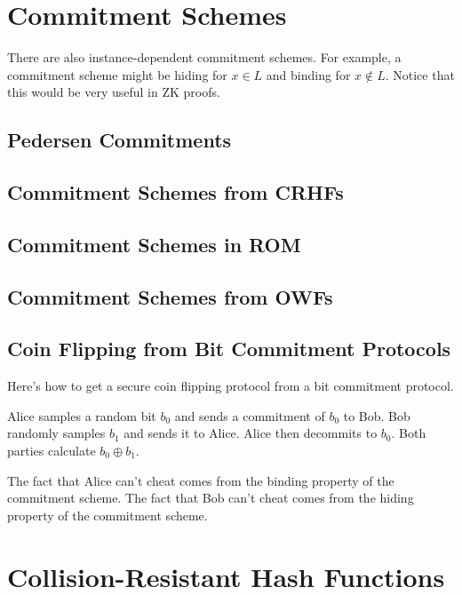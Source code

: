 \documentclass{article}
\theoremstyle{definition}
\begin{document}
\newpage

\section{Commitment Schemes}

There are also instance-dependent commitment schemes. For example, a commitment scheme might be hiding
for $x \in L$ and binding for $x \notin L$. Notice that this would be very useful in ZK proofs.

\subsection{Pedersen Commitments}

\subsection{Commitment Schemes from CRHFs}

\subsection{Commitment Schemes in ROM}

\subsection{Commitment Schemes from OWFs}

\subsection{Coin Flipping from Bit Commitment Protocols}

Here's how to get a secure coin flipping protocol from a bit commitment protocol.

Alice samples a random bit $b_{0}$ and sends a commitment of $b_{0}$
to Bob. Bob randomly samples $b_{1}$ and sends it to Alice. Alice
then decommits to $b_{0}$. Both parties calculate $b_{0} \oplus b_{1}$.

The fact that Alice can't cheat comes from the binding property
of the commitment scheme. The fact that Bob can't cheat comes from the
hiding property of the commitment scheme.

\newpage

\section{Collision-Resistant Hash Functions}
\end{document}
